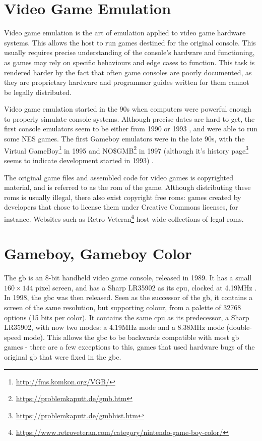 \documentclass[11pt]{report}
\newcommand{\ftnt}[1]{\footnote{\url{#1}}}
\begin{document}
\section{Video Game Emulation}

Video game emulation is the art of emulation applied to video game hardware systems. This allows the host to run games destined for the original console. This usually requires precise understanding of the console's hardware and functioning, as games may rely on specific behaviours and edge cases to function. This task is rendered harder by the fact that often game consoles are poorly documented, as they are proprietary hardware and programmer guides written for them cannot be legally distributed.

Video game emulation started in the 90s when computers were powerful enough to properly simulate console systems. Although precise dates are hard to get, the first console emulators seem to be either from 1990 or 1993 \cite{first_nes_emu}, and were able to run some NES games. The first Gameboy emulators were in the late 90s, with the Virtual GameBoy\ftnt{http://fms.komkon.org/VGB/} in 1995 and NO\$GMB\ftnt{https://problemkaputt.de/gmb.htm} in 1997 (although it's history page\ftnt{https://problemkaputt.de/gmbhist.htm} seems to indicate development started in 1993) \cite{first_gb_emus}.

The original game files and assembled code for video games is copyrighted material, and is referred to as the \gls{rom} of the game. Although distributing these \glspl{rom} is usually illegal, there also exist copyright free \glspl{rom}: games created by developers that chose to license them under Creative Commons licenses, for instance. Websites such as Retro Veteran\ftnt{https://www.retroveteran.com/category/nintendo-game-boy-color/} host wide collections of legal \glspl{rom}.

\section{Gameboy, Gameboy Color}

The \gls{gb} is an 8-bit handheld video game console, released in 1989. It has a small $160 \times 144$ pixel screen, and has a Sharp LR35902 as its \gls{cpu}, clocked at 4.19MHz \cite[Specifications]{pandoc}. In 1998, the \gls{gbc} was then released. Seen as the successor of the \gls{gb}, it contains a screen of the same resolution, but supporting colour, from a palette of 32768 options (15 bits per color). It contains the same \gls{cpu} as its predecessor, a Sharp LR35902, with now two modes: a 4.19MHz mode and a 8.38MHz mode (double-speed mode). This allows the \gls{gbc} to be backwards compatible with most \gls{gb} games - there are a few exceptions to this, games that used hardware bugs of the original \gls{gb} that were fixed in the \gls{gbc}.
\end{document}
